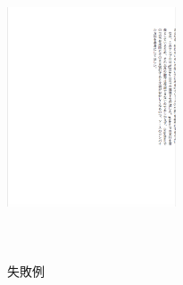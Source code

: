﻿\documentclass[a4j,12pt,landscape]{tarticle}
\begin{document}
\begin{figure}[htbp]
 \begin{center}
  \includegraphics[width=5cm, height=9cm, angle=90]{err.png}
 \end{center}
 \caption{失敗例}
 \label{fig:one}
\end{figure}
\end{document}

